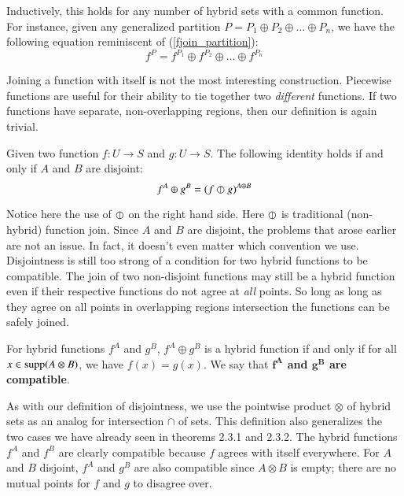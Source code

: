 Inductively, this holds for any number of hybrid sets with a common function.
For instance, given any generalized partition $P = P_1 \oplus P_2 \oplus \ldots \oplus P_n$, 
we have the following equation reminiscent of (\ref{fjoin_partition}):
\begin{equation}
 	f^P = f^{P_1} \oplus f^{P_2} \oplus \ldots \oplus f^{P_n}
\end{equation}


Joining a function with itself is not the most interesting construction.
Piecewise functions are useful for their ability to tie together two \emph{different} functions.
If two functions have separate, non-overlapping regions, then our definition is again trivial.


\begin{theorem}
	Given two function $f : U \to S$ and $g : U \to S$. The following identity holds if and only if $A$ and $B$ are disjoint:
	\begin{equation}
		f^A \oplus g^B = (f \varobar g)^{A \oplus B}
	\end{equation}
\end{theorem}


Notice here the use of $\varobar$ on the right hand side.
Here $\varobar$ is traditional (non-hybrid) function join.
Since $A$ and $B$ are disjoint, the problems that arose earlier are not an issue.
In fact, it doesn't even matter which convention we use.
Disjointness is still too strong of a condition for two hybrid functions to be compatible.
The join of two non-disjoint functions may still be a hybrid function 
even if their respective functions do not agree at \emph{all} points.
So long as long as they agree on all points in overlapping regions intersection the functions can be safely joined.


\begin{definition}
	For hybrid functions $f^A$ and $g^B$, $f^A \oplus g^B$ is a hybrid function
	if and only if for all $x \in \text{supp} (A \otimes B)$, we have $f(x) = g(x)$.
	We say that \textbf{$\boldsymbol{f^A}$ and $\boldsymbol{g^B}$ are compatible}.
\end{definition}


As with our definition of disjointness, we use the pointwise product $\otimes$ 
of hybrid sets as an analog for intersection $\cap$ of sets.
This definition also generalizes the two cases we have already seen in theorems 2.3.1 and 2.3.2.
The hybrid functions $f^A$ and $f^B$ are clearly compatible because $f$ agrees with itself everywhere.
For $A$ and $B$ disjoint, $f^A$ and $g^B$ are also compatible since $A \otimes B$ is empty;
there are no mutual points for $f$ and $g$ to disagree over.

